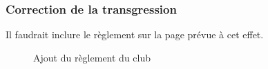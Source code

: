 \documentclass{article}[12pt]
\begin{document}
     \subsubsection*{Correction de la transgression}
    Il faudrait inclure le règlement sur la page prévue à cet effet.
     \begin{figure}[H]
     	\centering
     	\caption{Ajout du règlement du club}
     \end{figure}

\end{document}
